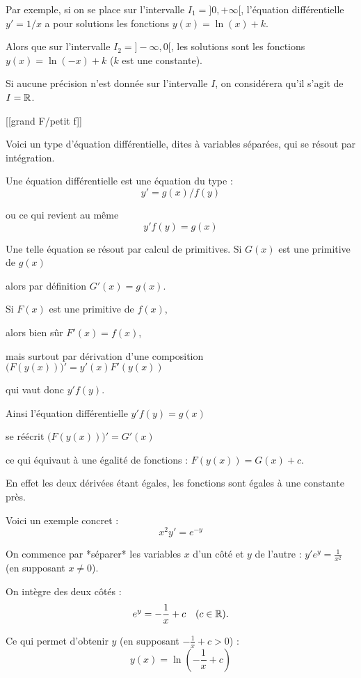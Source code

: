   \change
  Par exemple, si on se place sur l'intervalle $I_1 = ]0, +\infty[$,
  l'équation différentielle $y' = 1/x$ a pour solutions les fonctions $y(x) = \ln(x) + k$.
  
  \change
Alors que sur l'intervalle $I_2 = ]-\infty, 0[$, les solutions sont les fonctions $y(x) = \ln(-x) + k$
($k$ est une constante). 

  \change Si aucune précision n'est donnée sur l'intervalle $I$, 
  on considérera qu'il s'agit de $I = \mathbb{R}$.
  

\diapo

[[grand F/petit f]]


Voici un type d'équation différentielle, dites à variables séparées,
qui se résout par intégration.

\change
Une équation différentielle  est une équation
du type : 
$$y'=g(x)/f(y)$$

\change
ou ce qui revient au même 
$$y'f(y)=g(x)$$

\change
Une telle équation se résout par calcul de primitives.
Si $G(x)$ est une primitive de $g(x)$ 

\change
alors par définition $G'(x)=g(x)$.

\change
Si $F(x)$ est une primitive de $f(x)$, 

alors bien sûr $F'(x)=f(x)$, 


\change
mais surtout par dérivation d'une composition
$\big(F(y(x))\big)' = y'(x) F'(y(x))$

\change
qui vaut donc $y' f(y)$.

\change
Ainsi l'équation différentielle $y'f(y)=g(x)$

\change
se réécrit $\big(F(y(x))\big)' = G'(x)$

\change
ce qui équivaut à une égalité de fonctions :
$F(y(x))=G(x)+c$.  

En effet les deux dérivées étant égales, les fonctions sont égales
à une constante près.

\change
Voici un exemple concret :
$$x^2y' = e^{-y}$$

\change
On commence par *séparer* les variables $x$ d'un côté et $y$ de l'autre :
$y'e^{y} = \frac{1}{x^2}$  (en supposant $x\neq 0$).

\change
On intègre des deux côtés :
$$e^{y} = -\frac{1}{x}+c \quad (c\in\mathbb{R}).$$

\change
Ce qui permet d'obtenir $y$ (en supposant $-\frac{1}{x}+c>0$) :
$$y(x) = \ln\left(-\frac{1}{x}+c\right)$$

